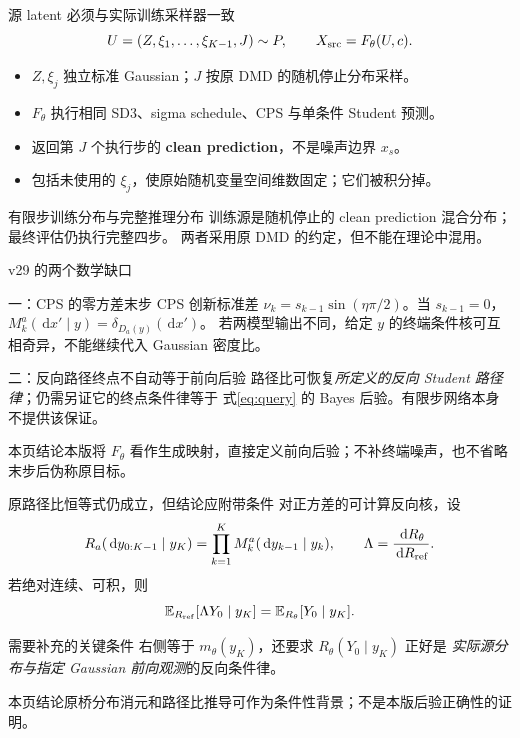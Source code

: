 \documentclass[10pt,aspectratio=169]{beamer}
\newcommand{\E}{\mathbb E}
\newcommand{\dd}{\,\mathrm d}
\newcommand{\takeaway}[1]{\begin{exampleblock}{本页结论}\small #1\end{exampleblock}}
\begin{document}
\begin{frame}{源 latent 必须与实际训练采样器一致}
\small
\begin{equation}\label{eq:source-map}
U=(Z,\xi_1,\ldots,\xi_{K-1},J)\sim P,\qquad
X_{\rm src}=F_\theta(U,c).
\end{equation}
\begin{itemize}\itemsep4pt
\item $Z,\xi_j$ 独立标准 Gaussian；$J$ 按原 DMD 的随机停止分布采样。
\item $F_\theta$ 执行相同 SD3、sigma schedule、CPS 与单条件 Student 预测。
\item 返回第 $J$ 个执行步的 \textbf{clean prediction}，不是噪声边界 $x_s$。
\item 包括未使用的 $\xi_j$，使原始随机变量空间维数固定；它们被积分掉。
\end{itemize}
\begin{alertblock}{有限步训练分布与完整推理分布}
训练源是随机停止的 clean prediction 混合分布；最终评估仍执行完整四步。
两者采用原 DMD 的约定，但不能在理论中混用。
\end{alertblock}
\end{frame}

\begin{frame}{v29 的两个数学缺口}
\small
\begin{block}{一：CPS 的零方差末步}
CPS 创新标准差 $\nu_k=s_{k-1}\sin(\eta\pi/2)$。当 $s_{k-1}=0$，
$M^a_k(\dd x'\mid y)=\delta_{D_a(y)}(\dd x')$。
若两模型输出不同，给定 $y$ 的终端条件核可互相奇异，不能继续代入 Gaussian 密度比。
\end{block}
\begin{block}{二：反向路径终点不自动等于前向后验}
路径比可恢复\emph{所定义的反向 Student 路径律}；仍需另证它的终点条件律等于
式\eqref{eq:query} 的 Bayes 后验。有限步网络本身不提供该保证。
\end{block}
\takeaway{本版将 $F_\theta$ 看作生成映射，直接定义前向后验；不补终端噪声，也不省略末步后伪称原目标。}
\end{frame}

\begin{frame}{原路径比恒等式仍成立，但结论应附带条件}
\small
对正方差的可计算反向核，设
\begin{equation}
R_a(\dd y_{0:K-1}\mid y_K)=\prod_{k=1}^{K}M_k^a(\dd y_{k-1}\mid y_k),\qquad
\Lambda=\frac{\dd R_\theta}{\dd R_{\rm ref}}.
\end{equation}
若绝对连续、可积，则
\begin{equation}
\E_{R_{\rm ref}}[\Lambda Y_0\mid y_K]
=\E_{R_\theta}[Y_0\mid y_K].
\end{equation}
\begin{alertblock}{需要补充的关键条件}
右侧等于 $m_\theta(y_K)$，还要求 $R_\theta(Y_0\mid y_K)$ 正好是
\emph{实际源分布与指定 Gaussian 前向观测}的反向条件律。
\end{alertblock}
\takeaway{原桥分布消元和路径比推导可作为条件性背景；不是本版后验正确性的证明。}
\end{frame}
\end{document}
